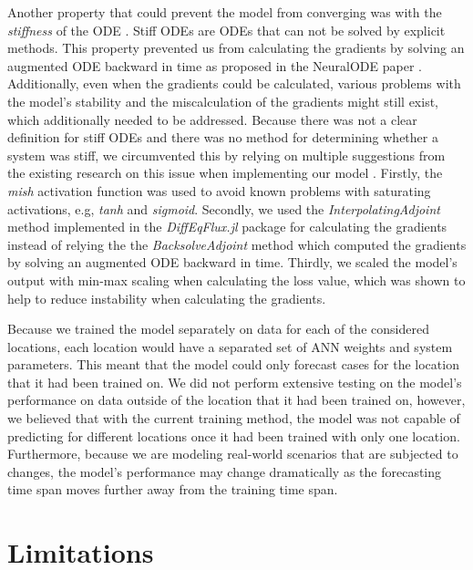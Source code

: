 Another property that could prevent the model from converging was with the \textit{stiffness} of the \gls{ODE} \cite{kimStiffNeuralOrdinary2021}.
Stiff \glspl{ODE} are \glspl{ODE} that can not be solved by explicit methods.
This property prevented us from calculating the gradients by solving an augmented \gls{ODE} backward in time as proposed in the \gls{NeuralODE} paper \cite{chenNeuralOrdinaryDifferential2019}.
Additionally, even when the gradients could be calculated, various problems with the model's stability and the miscalculation of the gradients might still exist, which additionally needed to be addressed.
Because there was not a clear definition for stiff \glspl{ODE} and there was no method for determining whether a system was stiff, we circumvented this by relying on multiple suggestions from the existing research on this issue when implementing our model \cite{kimStiffNeuralOrdinary2021}.
Firstly, the \textit{mish} activation function \cite{misraMishSelfRegularized2020} was used to avoid known problems with saturating activations, e.g, \textit{tanh} and \textit{sigmoid}.
Secondly, we used the \textit{InterpolatingAdjoint} method implemented in the \textit{DiffEqFlux.jl} package for calculating the gradients instead of relying the the \textit{BacksolveAdjoint} method which computed the gradients by solving an augmented \gls{ODE} backward in time.
Thirdly, we scaled the model's output with min-max scaling when calculating the loss value, which was shown to help to reduce instability when calculating the gradients.

Because we trained the model separately on data for each of the considered locations, each location would have a separated set of \gls{ANN} weights and system parameters.
This meant that the model could only forecast cases for the location that it had been trained on.
We did not perform extensive testing on the model's performance on data outside of the location that it had been trained on, however, we believed that with the current training method, the model was not capable of predicting for different locations once it had been trained with only one location.
Furthermore, because we are modeling real-world scenarios that are subjected to changes, the model's performance may change dramatically as the forecasting time span moves further away from the training time span.

\section{Limitations}


